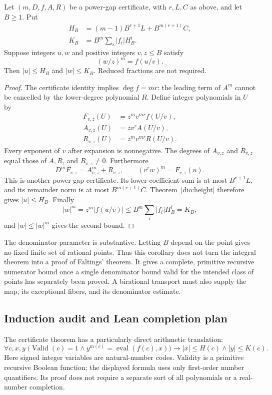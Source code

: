\begin{corollary}
\label{dio:denominators}
Let $(m,D,f,A,R)$ be a power-gap certificate, with $r,L,C$ as above,
and let $B\geq1$.  Put
\[
 \begin{split}
 H_B&=(m-1)B^{r+1}L+B^{m(r+1)}C,\\
 K_B&=B^m\sum_i |f_i|H_B^i.
 \end{split}
\]
Suppose integers $u,w$ and positive integers $v,z\leq B$ satisfy
\[
                         (w/z)^m=f(u/v).
\]
Then $|u|\leq H_B$ and $|w|\leq K_B$.  Reduced fractions are not
required.
\end{corollary}
\begin{proof}
The certificate identity implies $\deg f=mr$: the leading term of
$A^m$ cannot be cancelled by the lower-degree polynomial $R$.
Define integer polynomials in $U$ by
\[
 \begin{split}
 F_{v,z}(U)&=z^m v^{mr}f(U/v),\\
 A_{v,z}(U)&=zv^r A(U/v),\\
 R_{v,z}(U)&=z^m v^{mr}R(U/v).
 \end{split}
\]
Every exponent of $v$ after expansion is nonnegative.  The degrees of
$A_{v,z}$ and $R_{v,z}$ equal those of $A,R$, and $R_{v,z}\ne0$.
Furthermore
\[
       D^mF_{v,z}=A_{v,z}^m+R_{v,z},\qquad
       (v^r w)^m=F_{v,z}(u).
\]
This is another power-gap certificate.  Its lower-coefficient sum is
at most $B^{r+1}L$, and its remainder norm is at most
$B^{m(r+1)}C$.  Theorem~\ref{dio:height} therefore gives
$|u|\leq H_B$.  Finally
\[
 |w|^m=z^m|f(u/v)|
       \leq B^m\sum_i|f_i|H_B^i=K_B,
\]
and $|w|\leq|w|^m$ gives the second bound.
\end{proof}

The denominator parameter is substantive.  Letting $B$ depend on the
point gives no fixed finite set of rational points.  Thus this corollary
does not turn the integral theorem into a proof of Faltings' theorem.
It gives a complete, primitive recursive numerator bound once a single
denominator bound valid for the intended class of points has separately
been proved.  A birational transport must also supply the map, its
exceptional fibers, and its denominator estimate.

\subsection{Induction audit and Lean completion plan}

The certificate theorem has a particularly direct arithmetic translation:
\[
 \forall c,x,y\;\bigl(\operatorname{Valid}(c)=1\wedge
 y^{m(c)}=\operatorname{eval}(f(c),x)\bigr)
 \longrightarrow |x|\leq H(c)\wedge |y|\leq K(c).
\]
Here signed integer variables are natural-number codes.  Validity is a
primitive recursive Boolean function; the displayed formula uses only
first-order number quantifiers.  Its proof does not require a separate
sort of all polynomials or a real-number completion.

